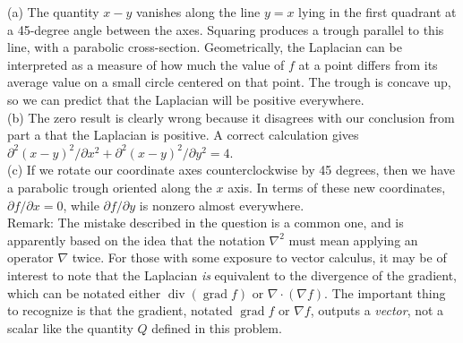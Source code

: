 (a) The quantity $x-y$ vanishes along the line $y=x$ lying in the
first quadrant at a 45-degree angle between the axes. Squaring produces
a trough parallel to this line, with a parabolic cross-section. Geometrically,
the Laplacian can be interpreted as a measure of how much the value of $f$
at a point differs from its average value on a small circle centered on
that point. The trough is concave up, so we can predict that the Laplacian
will be positive everywhere.\\
(b) The zero result is clearly wrong because it disagrees with our conclusion
from part a that the Laplacian is positive. A correct calculation gives
$\partial^2(x-y)^2/\partial x^2+\partial^2(x-y)^2/\partial y^2=4$.\\
(c) If we rotate our coordinate axes counterclockwise by 45 degrees, then we have a parabolic
trough oriented along the $x$ axis. In terms of these new coordinates,
$\partial f/\partial x=0$, while $\partial f/\partial y$ is nonzero almost
everywhere.\\
Remark: The mistake described in the question is a common one, and is apparently
based on the idea that the notation $\nabla^2$ must mean applying an operator
$\nabla$ twice. For those with some exposure to vector calculus, it may be
of interest to note that the Laplacian \emph{is} equivalent to the divergence
of the gradient, which can be notated either $\operatorname{div}(\operatorname{grad} f)$ or
$\nabla\cdot(\nabla f)$. The important thing to recognize is that the gradient,
notated $\operatorname{grad} f$ or $\nabla f$, outputs a \emph{vector}, not a scalar
like the quantity $Q$ defined in this problem.
